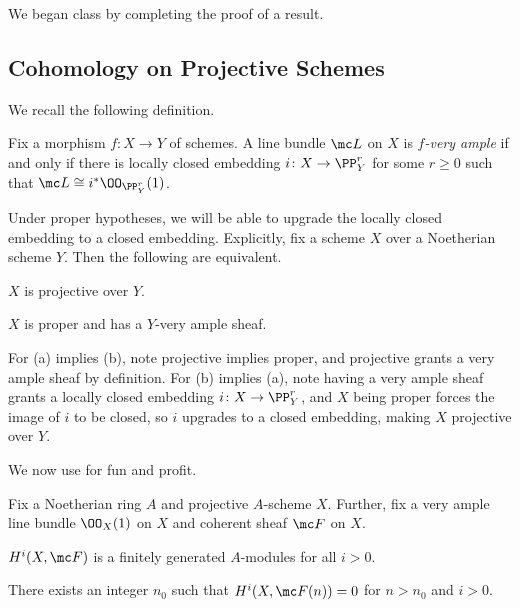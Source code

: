 \documentclass[../notes.tex]{subfiles}
\begin{document}
We began class by completing the proof of a result.

\subsection{Cohomology on Projective Schemes}
We recall the following definition.
\begin{definition}
	Fix a morphism $f\colon X\to Y$ of schemes. A line bundle $\mc L$ on $X$ is \textit{$f$-very ample} if and only if there is locally closed embedding $i\colon X\to\PP^r_Y$ for some $r\ge0$ such that $\mc L\cong i^*\OO_{\PP^r_Y}(1)$.
\end{definition}
\begin{remark}
	Under proper hypotheses, we will be able to upgrade the locally closed embedding to a closed embedding. Explicitly, fix a scheme $X$ over a Noetherian scheme $Y$. Then the following are equivalent.
	\begin{listalph}
		\item $X$ is projective over $Y$.
		\item $X$ is proper and has a $Y$-very ample sheaf.
	\end{listalph}
	For (a) implies (b), note projective implies proper, and projective grants a very ample sheaf by definition. For (b) implies (a), note having a very ample sheaf grants a locally closed embedding $i\colon X\to\PP^r_Y$, and $X$ being proper forces the image of $i$ to be closed, so $i$ upgrades to a closed embedding, making $X$ projective over $Y$.
\end{remark}
We now use  for fun and profit.
\begin{theorem} \label{thm:coh-cohom-proj-space}
	Fix a Noetherian ring $A$ and projective $A$-scheme $X$. Further, fix a very ample line bundle $\OO_X(1)$ on $X$ and coherent sheaf $\mc F$ on $X$.
	\begin{listalph}
		\item $H^i(X,\mc F)$ is a finitely generated $A$-modules for all $i>0$.
		\item There exists an integer $n_0$ such that $H^i(X,\mc F(n))=0$ for $n>n_0$ and $i>0$.
	\end{listalph}
\end{theorem}
\end{document}
